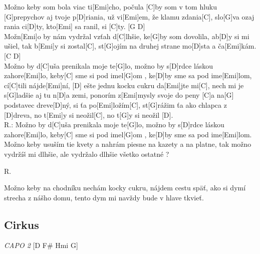 \documentclass[10pt]{article}
\begin{document}
\begin{Large}
\begin{minipage}{\textwidth}
\begin{multicols*}{2}
\begin{guitar}
	Možno keby som bola viac ti[Emi]cho,
	počula [C]by som v tom hluku [G]prepychov
	 aj tvoje p[D]riania,
	už vi[Emi]em, že klamu zdania[C],
	 slo[G]va ozaj rania ci[D]ty, 
	kto[Emi] sa ranil, si [C]ty. [G D]
	\\
	Možn[Emi]o by nám vydržal vzťah d[C]lhšie,
	ke[G]by som dovolila, ab[D]y si mi ušiel,
	tak b[Emi]y si zostal[C],
	st[G]ojím na druhej strane mo[D]sta 
	 a ča[Emi]kám. [C D]
	\\
	Možno by d[C]uša prenikala moje te[G]lo,
	možno by s[D]rdce láskou zahore[Emi]lo,
	keby[C] sme si pod imel[G]om ,
	ke[D]by sme sa pod ime[Emi]lom,
	cí[C]tili nájde[Emi]ní,
	[D] ešte jednu kocku cukru da[Emi]jte mi[C],
	nech mi je s[G]ladšie aj tu n[D]a zemi,
	ponorím z[Emi]mysly svoje do peny
	[C]a na[G] podstavec dreve[D]ný,
	si ťa po[Emi]ložím[C],
	st[G]rážim ťa ako chlapca z [D]dreva,
	no t[Emi]y si neožil[C],
	no t[G]y si neožil [D].
	\\
	R.: Možno by d[C]uša prenikala moje te[G]lo,
	možno by s[D]rdce láskou zahore[Emi]lo,
	keby[C] sme si pod imel[G]om ,
	ke[D]by sme sa pod ime[Emi]lom.
	\\
	Možno keby usuším tie kvety
	a nahrám piesne na kazety
	a na platne,
	tak možno vydržíš mi dlhšie,
	ale vydržalo dlhšie všetko ostatné ?
	
	R.
	
	Možno keby na chodníku nechám
	kocky cukru, nájdem cestu späť,
	ako si dymí strecha z nášho domu,
	tento dym mi navždy bude v hlave tkvieť.
\end{guitar}
\end{multicols*}
\end{minipage}

\begin{minipage}{\textwidth}
\subsection{Cirkus}
\begin{multicols}{2}
\begin{guitar}
	\textit{CAPO 2}
	[D F# Hmi G]
	

\end{guitar}
\end{multicols}
\end{minipage}
\end{Large}
\end{document}
